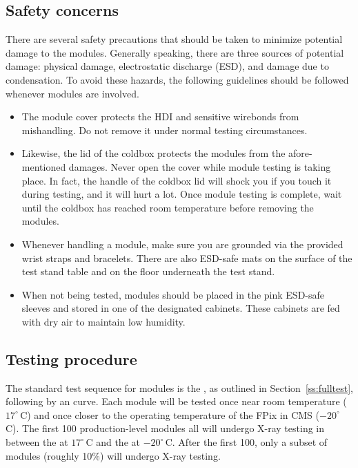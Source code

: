\subsection{Safety concerns}
\label{ss:safety}

There are several safety precautions that should be taken to minimize potential damage to the modules.
Generally speaking, there are three sources of potential damage: 
physical damage, electrostatic discharge (ESD), and damage due to condensation.
To avoid these hazards, the following guidelines should be followed whenever modules are involved.
\begin{itemize}
\item The module cover protects the HDI and sensitive wirebonds from mishandling.
Do not remove it under normal testing circumstances.
\item Likewise, the lid of the coldbox protects the modules from the afore-mentioned damages.  
Never open the cover while module testing is taking place.  
In fact, the handle of the coldbox lid will shock you if you touch it during testing, and it will hurt a lot.
Once module testing is complete, wait until the coldbox has reached room temperature before removing the modules.
\item Whenever handling a module, make sure you are grounded via the provided wrist straps and bracelets.
There are also ESD-safe mats on the surface of the test stand table and on the floor underneath the test stand.
\item When not being tested, modules should be placed in the pink ESD-safe sleeves and stored in one of the designated cabinets.
These cabinets are fed with dry air to maintain low humidity.
\end{itemize}

\subsection{Testing procedure}
\label{ss:procedure}

The standard test sequence for modules is the \fulltest, as outlined in Section~\ref{ss:fulltest}, following by an \iv curve.
Each module will be tested once near room temperature ($17^\circ\,$C) 
and once closer to the operating temperature of the FPix in CMS ($-20^\circ\,$C).
The first 100 production-level modules all will undergo X-ray testing in between the \fulltest at $17^\circ\,$C and the \fulltest at $-20^\circ\,$C.
After the first 100, only a subset of modules (roughly 10\%) will undergo X-ray testing.


